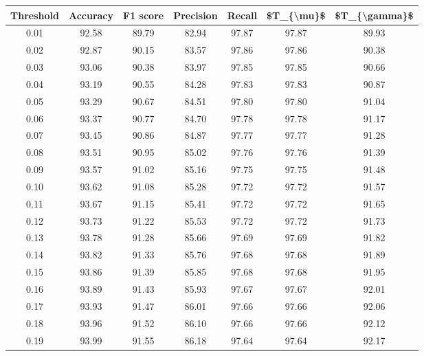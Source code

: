 \begin{tabular}{|c|c|c|c|c|c|c|}
\hline
 Threshold &  Accuracy &  F1 score &  Precision &  Recall &  \$T\_\{\textbackslash mu\}\$ &  \$T\_\{\textbackslash gamma\}\$ \\
\hline
      0.01 &     92.58 &     89.79 &      82.94 &   97.87 &      97.87 &         89.93 \\
      0.02 &     92.87 &     90.15 &      83.57 &   97.86 &      97.86 &         90.38 \\
      0.03 &     93.06 &     90.38 &      83.97 &   97.85 &      97.85 &         90.66 \\
      0.04 &     93.19 &     90.55 &      84.28 &   97.83 &      97.83 &         90.87 \\
      0.05 &     93.29 &     90.67 &      84.51 &   97.80 &      97.80 &         91.04 \\
      0.06 &     93.37 &     90.77 &      84.70 &   97.78 &      97.78 &         91.17 \\
      0.07 &     93.45 &     90.86 &      84.87 &   97.77 &      97.77 &         91.28 \\
      0.08 &     93.51 &     90.95 &      85.02 &   97.76 &      97.76 &         91.39 \\
      0.09 &     93.57 &     91.02 &      85.16 &   97.75 &      97.75 &         91.48 \\
      0.10 &     93.62 &     91.08 &      85.28 &   97.72 &      97.72 &         91.57 \\
      0.11 &     93.67 &     91.15 &      85.41 &   97.72 &      97.72 &         91.65 \\
      0.12 &     93.73 &     91.22 &      85.53 &   97.72 &      97.72 &         91.73 \\
      0.13 &     93.78 &     91.28 &      85.66 &   97.69 &      97.69 &         91.82 \\
      0.14 &     93.82 &     91.33 &      85.76 &   97.68 &      97.68 &         91.89 \\
      0.15 &     93.86 &     91.39 &      85.85 &   97.68 &      97.68 &         91.95 \\
      0.16 &     93.89 &     91.43 &      85.93 &   97.67 &      97.67 &         92.01 \\
      0.17 &     93.93 &     91.47 &      86.01 &   97.66 &      97.66 &         92.06 \\
      0.18 &     93.96 &     91.52 &      86.10 &   97.66 &      97.66 &         92.12 \\
      0.19 &     93.99 &     91.55 &      86.18 &   97.64 &      97.64 &         92.17 \\

\end{tabular}
